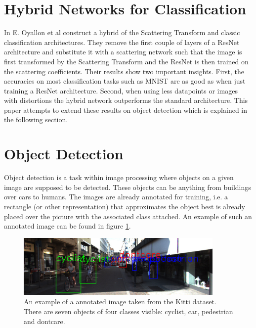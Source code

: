 \section{Hybrid Networks for Classification}
\label{section:hybrid_networks_for_classification}

In \cite{ScalingTheScatteringTransform2017} E. Oyallon et al construct a hybrid of the Scattering Transform and classic classification architectures. They remove the first couple of layers of a ResNet \cite{ResNet15} architecture and substitute it with a scattering network such that the image is first transformed by the Scattering Transform and the ResNet is then trained on the scattering coefficients. Their results show two important insights. First, the accuracies on most classification tasks such as MNIST are as good as when just training a ResNet architecture. Second, when using less datapoints or images with distortions the hybrid network outperforms the standard architecture. This paper attempts to extend these results on object detection which is explained in the following section. 

\section{Object Detection}
\label{sec:object_detection}

Object detection is a task within image processing where objects on a given image are supposed to be detected. These objects can be anything from buildings over cars to humans. The images are already annotated for training, i.e. a rectangle (or other representation) that approximates the object best is already placed over the picture with the associated class attached. An example of such an annotated image can be found in figure \ref*{fig:annot_example}.

\begin{figure}[!htb]
	\centering
	\includegraphics[width=0.9\textwidth]{images/Annotations_example.png}
	\caption{An example of a annotated image taken from the Kitti dataset. There are seven objects of four classes visible: cyclist, car, pedestrian and dontcare.}
	\label{fig:annot_example}
\end{figure}

